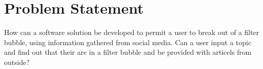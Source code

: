 \section{Problem Statement}

How can a software solution be developed to permit a user to break out of a
filter bubble, using information gathered from social media.
Can a user input a topic and find out that their are in a filter bubble and be
provided with articels from outside?